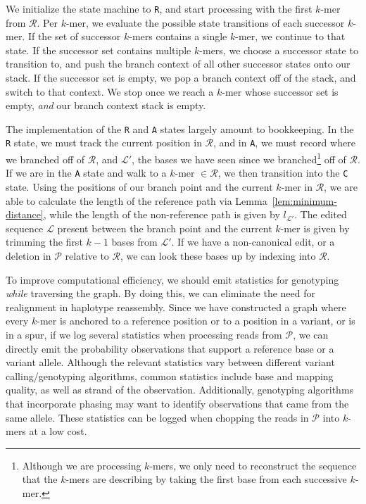 \documentclass[masters]{ucbthesis}
\begin{document}
We initialize the state machine to \texttt{R}, and start processing with the first $k$-mer from $\mathcal{R}$.
Per $k$-mer, we evaluate the possible state transitions of each successor $k$-mer. If the set of successor
$k$-mers contains a single $k$-mer, we continue to that state. If the successor set contains multiple
$k$-mers, we choose a successor state to transition to, and push the branch context of all other
successor states onto our stack. If the successor set is empty, we pop a branch context off of the stack,
and switch to that context. We stop once we reach a $k$-mer whose successor set is empty, \emph{and}
our branch context stack is empty.

The implementation of the \texttt{R} and \texttt{A} states largely amount to bookkeeping. In the \texttt{R}
state, we must track the current position in $\mathcal{R}$, and in \texttt{A}, we must record where we
branched off of $\mathcal{R}$, and $\mathcal{L}'$, the bases we have seen since we
branched\footnote{Although we are processing $k$-mers, we only need to reconstruct the sequence that
the $k$-mers are describing by taking the first base from each successive $k$-mer.} off of $\mathcal{R}$.
If we are in the \texttt{A} state and walk to a $k$-mer $\in \mathcal{R}$, we then transition into the
\texttt{C} state. Using the positions of our branch point and the current $k$-mer in $\mathcal{R}$, we are
able to calculate the length of the reference path via Lemma~\ref{lem:minimum-distance}, while the length
of the non-reference path is given by $l_{\mathcal{L}'}$. The edited sequence $\mathcal{L}$ present
between the branch point and the current $k$-mer is given by trimming the first $k - 1$ bases from
$\mathcal{L}'$. If we have a non-canonical edit, or a deletion in $\mathcal{P}$ relative to $\mathcal{R}$,
we can look these bases up by indexing into $\mathcal{R}$.

To improve computational efficiency, we should emit statistics for genotyping \emph{while} traversing the graph. By doing 
this, we can eliminate the need for realignment in haplotype reassembly. Since we have constructed a
graph where every $k$-mer is anchored to a reference position or to a position in a variant, or is in a spur,
if we log several statistics when processing reads from $\mathcal{P}$, we can directly emit the probability
observations that support a reference base or a variant allele. Although the relevant statistics vary
between different variant calling/genotyping algorithms, common statistics include base and mapping
quality, as well as strand of the observation. Additionally, genotyping algorithms that incorporate phasing
may want to identify observations that came from the same allele. These statistics can be logged when
chopping the reads in $\mathcal{P}$ into $k$-mers at a low cost.
\end{document}

